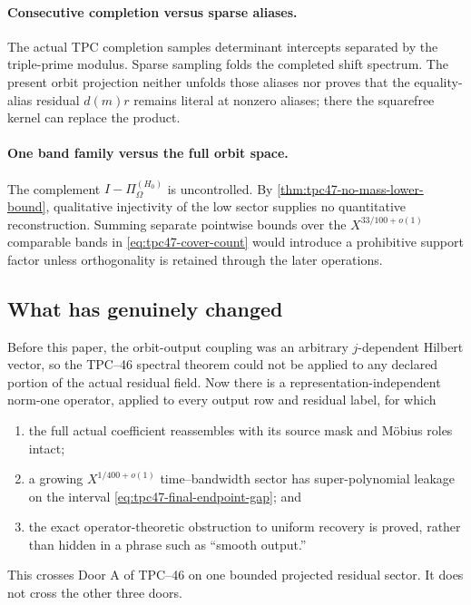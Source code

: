 \paragraph{Consecutive completion versus sparse aliases.}
The actual TPC completion samples determinant intercepts separated by
the triple-prime modulus.  Sparse sampling folds the completed shift
spectrum.  The present orbit projection neither unfolds those aliases
nor proves that the equality-alias residual \(d(m)r\) remains literal
at nonzero aliases; there the squarefree kernel can replace the product.

\paragraph{One band family versus the full orbit space.}
The complement \(I-\Pi_{\Omega}^{(H_0)}\) is uncontrolled.  By
\cref{thm:tpc47-no-mass-lower-bound}, qualitative injectivity of the
low sector supplies no quantitative reconstruction.  Summing separate
pointwise bounds over the \(X^{33/100+o(1)}\) comparable bands in
\eqref{eq:tpc47-cover-count} would introduce a prohibitive support
factor unless orthogonality is retained through the later operations.

\subsection{What has genuinely changed}

Before this paper, the orbit-output coupling was an arbitrary
\(j\)-dependent Hilbert vector, so the TPC--46 spectral theorem could
not be applied to any declared portion of the actual residual field.
Now there is a representation-independent norm-one operator, applied
to every output row and residual label, for which
\begin{enumerate}[label=\textup{(\roman*)},leftmargin=2.4em]
 \item the full actual coefficient reassembles with its source mask and
       M\"obius roles intact;
 \item a growing \(X^{1/400+o(1)}\) time--bandwidth sector has
       super-polynomial leakage on the interval
       \eqref{eq:tpc47-final-endpoint-gap}; and
 \item the exact operator-theoretic obstruction to uniform recovery is
       proved,
       rather than hidden in a phrase such as ``smooth output.''
\end{enumerate}
This crosses Door A of TPC--46 on one bounded projected residual sector.
It does not cross the other three doors.

